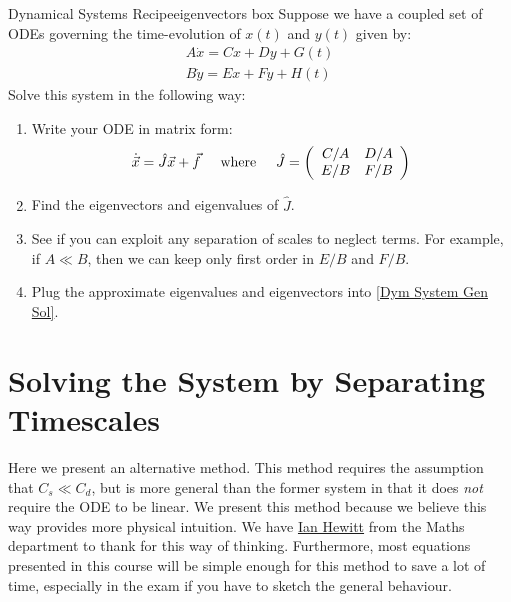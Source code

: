 \begin{fact}{Dynamical Systems Recipe}{eigenvectors box}\label{eigenvectors box}
    Suppose we have a coupled set of ODEs governing the time-evolution of $x(t)$ and $y(t)$ given by:
    \begin{align*}
        A \dot{x}= Cx + Dy + G(t)\\
        B \dot{y} = Ex + Fy + H(t)
    \end{align*}
    Solve this system in the following way:
    \begin{enumerate}
        \item Write your ODE in matrix form:
            \begin{align*}
                \dot{\vec{x}}=\hat{J}\vec{x}+\vec{f} \hspace{5 mm}\text{where} \hspace{5 mm}\hat{J} = \left( \begin{array}{cc}
                    C/A & D/A \\
                    E/B & F/B
                \end{array} \right)
            \end{align*}
        \item Find the eigenvectors and eigenvalues of $\hat{J}$.
        \item See if you can exploit any separation of scales to neglect terms. For example, if $A\ll B$, then we can keep only first order in $E/B$ and $F/B$. 
        \item Plug the approximate eigenvalues and eigenvectors into \ref{Dym System Gen Sol}.
    \end{enumerate}
\end{fact}


\section{Solving the System by Separating Timescales}\label{Hewitt Method}

Here we present an alternative method. This method requires the assumption that $C_s\ll C_d$, but is more general than the former system in that it does \textit{not} require the ODE to be linear. We present this method because we believe this way provides more physical intuition. We have \href{https://people.maths.ox.ac.uk/hewitt/}{Ian Hewitt} from the Maths department to thank for this way of thinking. Furthermore, most equations presented in this course will be simple enough for this method to save a lot of time, especially in the exam if you have to sketch the general behaviour.

